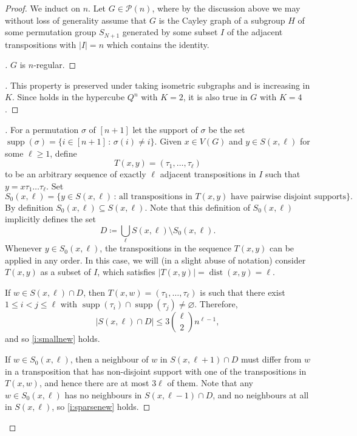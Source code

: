 \documentclass[reqno,a4paper,11pt]{amsart}
\newcounter{prop}
\theoremstyle{definition}
\newcommand{\dist}{\operatorname{dist}}
\newcommand{\supp}{\operatorname{supp}}
\renewcommand{\leq}{\leqslant}
\renewcommand{\geq}{\geqslant}
\renewcommand{\emptyset}{\varnothing}
\begin{document}
\begin{proof}
  We induct on $n$.
  Let $G \in \mathcal{P}(n)$, where by the discussion above we may without loss of generality assume that $G$ is the Cayley graph of a subgroup $H$ of some permutation group $S_{N+1}$ generated by some subset $I$ of the adjacent transpositions with $|I|=n$ which contains the identity.

  \begin{proof}[]\let\qed\relax
    $G$ is $n$-regular.
  \end{proof}

  \begin{proof}[]\let\qed\relax
    This property is preserved under taking isometric subgraphs and is increasing in $K$. Since  holds in the hypercube $Q^n$ with $K=2$, it is also true in $G$ with $K=4$.
  \end{proof}

  \begin{proof}[]\let\qed\relax
    For a permutation $\sigma$ of $[n+1]$ let the support of $\sigma$ be the set $\supp(\sigma)=\{i \in [n+1] \,:\, \sigma(i)\neq i\}$.
    Given $x \in V(G)$ and $y \in S(x, \ell)$ for some $\ell \geq 1$, define
    \[
      T(x,y) = (\tau_1,\dots, \tau_{\ell})
    \]
    to be an arbitrary sequence of exactly $\ell$ adjacent transpositions in $I$ such that $y = x\tau_1 \dots \tau_\ell$.
    Set
    \[
      S_0(x, \ell)= \{y \in S(x,\ell) \,:\, \text{all transpositions in $T(x,y)$ have pairwise disjoint supports}\}.
    \]
    By definition $S_0(x,\ell) \subseteq S(x, \ell)$. Note that this definition of $S_0(x,\ell)$ implicitly defines the set
    \[
      D \coloneqq \bigcup_{\ell} S(x,\ell) \setminus S_0(x, \ell).
    \]
    Whenever $y \in S_0(x, \ell)$, the transpositions in the sequence $T(x, y)$ can be applied in any order.
    In this case, we will (in a slight abuse of notation) consider $T(x,y)$ as a subset of $I$, which satisfies $|T(x,y)| = \dist(x,y)=\ell$.


    If $w \in S(x,\ell) \cap D$, then $T(x, w) = (\tau_1, \ldots, \tau_\ell)$ is such that there exist $1 \leq i < j \leq \ell$ with $\supp(\tau_i)\cap\supp(\tau_j)\neq\emptyset$.
    Therefore,
    \[
      |S(x,\ell) \cap D| \leq 3 \binom{\ell}{2} n^{\ell-1},
    \]
    and so \ref{i:smallnew} holds.

    If $w \in S_0(x, \ell)$, then a neighbour of $w$ in $S(x, \ell+1) \cap D$ must differ from $w$ in a transposition that has non-disjoint support with one of the transpositions in $T(x, w)$, and hence there are at most $3 \ell$ of them.
    Note that any $w \in S_0(x, \ell)$ has no neighbours in $S(x, \ell-1) \cap D$, and no neighbours at all in $S(x,\ell)$, so \ref{i:sparsenew} holds.


\end{proof}
\end{proof}
\end{document}
